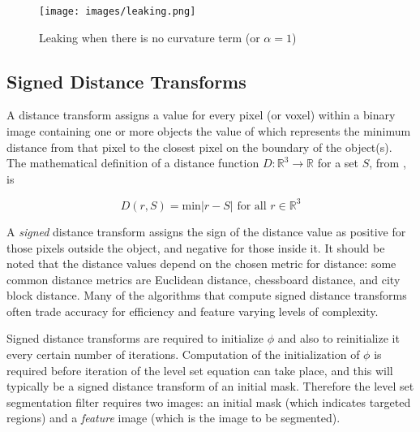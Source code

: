\begin{figure}[h]
	\centering
		\texttt{[image: images/leaking.png]}
	\caption{Leaking when there is no curvature term (or $\alpha = 1$)}
	\label{leaking}
\end{figure}


	\subsection{Signed Distance Transforms}
A distance transform assigns a value for every pixel (or voxel) within a binary image containing one or more objects the value of which represents the minimum distance from that pixel to the closest pixel on the boundary of the object(s). The mathematical definition of a distance function $D:\mathbb{R}^3 \rightarrow \mathbb{R}$ for a set $S$, from \cite{oshersethian}, is
	
	\begin{equation}
	D(r,S) = \textrm{min}{|r-S|} \textrm{ for all } r \in \mathbb{R}^3
	\label{eq:distancetransform}
	\end{equation}

A \textit{signed} distance transform assigns the sign of the distance value as positive for those pixels outside the object, and negative for those inside it. It should be noted that the distance values depend on the chosen metric for distance: some common distance metrics are Euclidean distance, chessboard distance, and city block distance. Many of the algorithms that compute signed distance transforms often trade accuracy for efficiency and feature varying levels of complexity.

Signed distance transforms are required to initialize $\phi$ and also to reinitialize it every certain number of iterations. Computation of the initialization of $\phi$ is required before iteration of the level set equation can take place, and this will typically be a signed distance transform of an initial mask. Therefore the level set segmentation filter requires two images: an initial mask (which indicates targeted regions) and a \textit{feature} image (which is the image to be segmented). 
	
